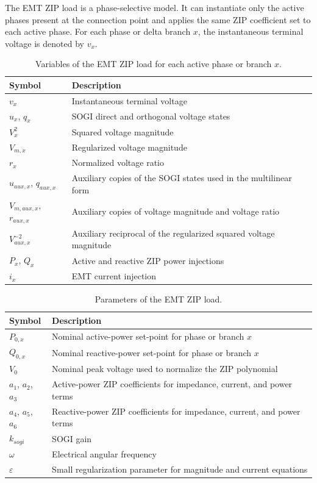 The EMT ZIP load is a phase-selective model. It can instantiate only the active phases present at the connection point and applies the same ZIP coefficient set to each active phase. For each phase or delta branch $x$, the instantaneous terminal voltage is denoted by $v_x$.

\begin{table}[H]
    \centering
    \caption{Variables of the EMT ZIP load for each active phase or branch $x$.}
    \begin{tabular}{ll}
        \toprule
        Symbol & Description \\
        \midrule
        $v_x$ & Instantaneous terminal voltage \\
        $u_x$, $q_x$ & SOGI direct and orthogonal voltage states \\
        $V_x^2$ & Squared voltage magnitude \\
        $V_{m,x}$ & Regularized voltage magnitude \\
        $r_x$ & Normalized voltage ratio \\
        $u_{aux,x}$, $q_{aux,x}$ & Auxiliary copies of the SOGI states used in the multilinear form \\
        $V_{m,aux,x}$, $r_{aux,x}$ & Auxiliary copies of voltage magnitude and voltage ratio \\
        $V^{-2}_{aux,x}$ & Auxiliary reciprocal of the regularized squared voltage magnitude \\
        $P_x$, $Q_x$ & Active and reactive ZIP power injections \\
        $i_x$ & EMT current injection \\
        \bottomrule
    \end{tabular}
\end{table}

\begin{table}[H]
    \centering
    \caption{Parameters of the EMT ZIP load.}
    \begin{tabular}{ll}
        \toprule
        Symbol & Description \\
        \midrule
        $P_{0,x}$ & Nominal active-power set-point for phase or branch $x$ \\
        $Q_{0,x}$ & Nominal reactive-power set-point for phase or branch $x$ \\
        $V_0$ & Nominal peak voltage used to normalize the ZIP polynomial \\
        $a_1$, $a_2$, $a_3$ & Active-power ZIP coefficients for impedance, current, and power terms \\
        $a_4$, $a_5$, $a_6$ & Reactive-power ZIP coefficients for impedance, current, and power terms \\
        $k_{sogi}$ & SOGI gain \\
        $\omega$ & Electrical angular frequency \\
        $\varepsilon$ & Small regularization parameter for magnitude and current equations \\
        \bottomrule
    \end{tabular}
\end{table}

